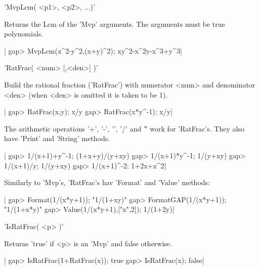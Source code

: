 'MvpLcm( <p1>, <p2>, ...)'

Returns  the Lcm  of the  'Mvp' arguments.  The arguments  must be  true
polynomials.

|    gap> MvpLcm(x^2-y^2,(x+y)^2);
    xy^2-x^2y-x^3+y^3|

%
%

'RatFrac( <num> [,<den>] )'

Build the rational fraction ('RatFrac') with numerator <num> and denominator 
<den> (when <den> is omitted it is taken to be 1).

|    gap> RatFrac(x,y);
    x/y
    gap> RatFrac(x*y^-1);
    x/y|


The arithmetic operations '+', '-', '\*',  '/' and '\^' work for 'RatFrac's.
They also  have 'Print' and  'String' methods.

|    gap> 1/(x+1)+y^-1;
    (1+x+y)/(y+xy)
    gap> 1/(x+1)*y^-1;
    1/(y+xy)
    gap> 1/(x+1)/y;   
    1/(y+xy)
    gap> 1/(x+1)^-2;
    1+2x+x^2|

Similarly to 'Mvp's, 'RatFrac's hav 'Format' and 'Value' methods:

|    gap> Format(1/(x*y+1));
    "1/(1+xy)"
    gap> FormatGAP(1/(x*y+1));
    "1/(1+x*y)"
    gap> Value(1/(x*y+1),["x",2]);
    1/(1+2y)|

%
%

'IsRatFrac( <p> )'

Returns 'true' if <p> is an 'Mvp' and false otherwise.

|    gap> IsRatFrac(1+RatFrac(x));
    true
    gap> IsRatFrac(x);         
    false|


